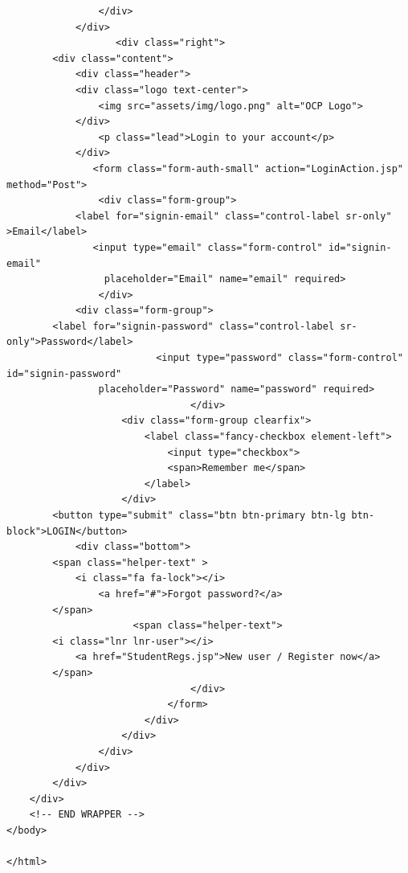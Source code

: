 \begin{lstlisting}
				</div>
			</div>
                   <div class="right">
		<div class="content">
			<div class="header">
			<div class="logo text-center">
				<img src="assets/img/logo.png" alt="OCP Logo">
			</div>
				<p class="lead">Login to your account</p>
			</div>
               <form class="form-auth-small" action="LoginAction.jsp" method="Post">
				<div class="form-group">
			<label for="signin-email" class="control-label sr-only" >Email</label>
               <input type="email" class="form-control" id="signin-email" 
				 placeholder="Email" name="email" required>
				</div>
			<div class="form-group">
		<label for="signin-password" class="control-label sr-only">Password</label>
                          <input type="password" class="form-control" id="signin-password"  
				placeholder="Password" name="password" required>
								</div>
					<div class="form-group clearfix">
						<label class="fancy-checkbox element-left">
							<input type="checkbox">
							<span>Remember me</span>
						</label>
					</div>
		<button type="submit" class="btn btn-primary btn-lg btn-block">LOGIN</button>
			<div class="bottom">
		<span class="helper-text" >
			<i class="fa fa-lock"></i> 
				<a href="#">Forgot password?</a>
		</span>
                      <span class="helper-text">
		<i class="lnr lnr-user"></i> 
			<a href="StudentRegs.jsp">New user / Register now</a>
		</span>
								</div>
							</form>
						</div>
					</div>
				</div>
			</div>
		</div>
	</div>
	<!-- END WRAPPER -->
</body>

</html>

\end{lstlisting}


